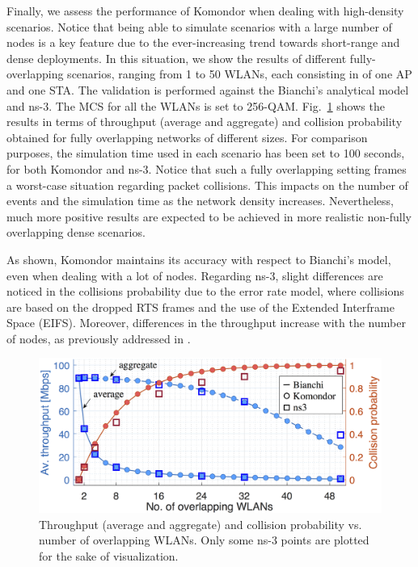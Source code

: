 \documentclass{article}
\begin{document}
	Finally, we assess the performance of Komondor when dealing with high-density scenarios. Notice that being able to simulate scenarios with a large number of nodes is a key feature due to the ever-increasing trend towards short-range and dense deployments. In this situation, we show the results of different fully-overlapping scenarios, ranging from 1 to 50 WLANs, each consisting in of one AP and one STA. The validation is performed against the Bianchi's analytical model and ns-3. The MCS for all the WLANs is set to 256-QAM. Fig.~\ref{fig:results_high_density_scenarios_throughput} shows the results in terms of throughput (average and aggregate) and collision probability obtained for fully overlapping networks of different sizes. For comparison purposes, the simulation time used in each scenario has been set to 100 seconds, for both Komondor and ns-3. Notice that such a fully overlapping setting frames a worst-case situation regarding packet collisions. This impacts on the number of events and the simulation time as the network density increases. Nevertheless, much more positive results are expected to be achieved in more realistic non-fully overlapping dense scenarios.
	
	As shown, Komondor maintains its accuracy with respect to Bianchi's model, even when dealing with a lot of nodes. Regarding ns-3, slight differences are noticed in the collisions probability due to the error rate model, where collisions are based on the dropped RTS frames and the use of the Extended Interframe Space (EIFS). Moreover, differences in the throughput increase with the number of nodes, as previously addressed in \cite{patidar2017validation}.
	
	\begin{figure}[t]
		\centering	
		\includegraphics[width=1\columnwidth]{results_scenario_3.png}
		\caption{Throughput (average and aggregate) and collision probability vs. number of overlapping WLANs. Only some ns-3 points are plotted for the sake of visualization.}
		\label{fig:results_high_density_scenarios_throughput}
	\end{figure}
	\label{section:density}
	
\end{document}
